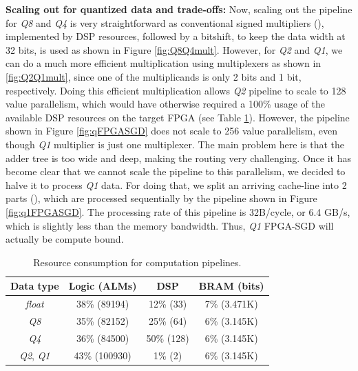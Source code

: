 \documentclass{article}
\newcommand*\circled[1]{\tikz[baseline=(char.base)]{
\node[shape=circle,draw,color=black,text=black,inner sep=0.05pt](char){#1};}}
\begin{document}
\noindent
\textbf{Scaling out for quantized data and trade-offs:} Now, scaling out the pipeline for \textit{Q8} and \textit{Q4} is very straightforward as conventional signed multipliers (\circled{3}), implemented by DSP resources, followed by a bitshift, to keep the data width at 32 bits, is used as shown in Figure \ref{fig:Q8Q4mult}. However, for \textit{Q2} and \textit{Q1}, we can do a much more efficient multiplication using multiplexers as shown in \ref{fig:Q2Q1mult}, since one of the multiplicands is only 2 bits and 1 bit, respectively. Doing this efficient multiplication allows \textit{Q2} pipeline to scale to 128 value parallelism, which would have otherwise required a 100\% usage of the available DSP resources on the target FPGA (see Table \ref{table:resources}). However, the pipeline shown in Figure \ref{fig:qFPGASGD} does not scale to 256 value parallelism, even though \textit{Q1} multiplier is just one multiplexer. The main problem here is that the adder tree is too wide and deep, making the routing very challenging. Once it has become clear that we cannot scale the pipeline to this parallelism, we decided to halve it to process \textit{Q1} data. For doing that, we split an arriving cache-line into 2 parts (\circled{4}), which are processed sequentially by the pipeline shown in Figure \ref{fig:q1FPGASGD}. The processing rate of this pipeline is 32B/cycle, or 6.4 GB/s, which is slightly less than the memory bandwidth. Thus, \textit{Q1} FPGA-SGD will actually be compute bound.
{\tiny
\begin{table}[t]
\centering
\caption{Resource consumption for computation pipelines.}
\label{table:resources}
\begin{tabular}{c|c|c|c}
Data type & Logic (ALMs) & DSP & BRAM (bits)\\
\hline
\textit{float} & 38\% (89194) & 12\% (33) & 7\% (3.471K) \\
\textit{Q8} & 35\% (82152) & 25\% (64) & 6\% (3.145K) \\
\textit{Q4} & 36\% (84500) & 50\% (128) & 6\% (3.145K) \\
\textit{Q2}, \textit{Q1} & 43\% (100930) & 1\% (2) & 6\% (3.145K) %
\end{tabular}
\end{table}
}
\end{document}
